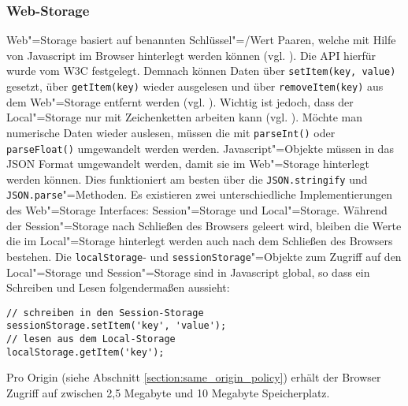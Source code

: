 \subsubsection*{Web-Storage}
Web"=Storage basiert auf benannten Schlüssel"=/Wert Paaren, welche mit Hilfe von Javascript im Browser hinterlegt werden können (vgl. \cite{html5upandrunning}). Die \ac{API} hierfür wurde vom \ac{W3C} festgelegt. Demnach können Daten über \texttt{setItem(key, value)} gesetzt, über \texttt{getItem(key)} wieder ausgelesen und über \texttt{removeItem(key)} aus dem Web"=Storage entfernt werden (vgl. \cite{W3C2011}). Wichtig ist jedoch, dass der Local"=Storage nur mit Zeichenketten arbeiten kann (vgl. \cite{W3C2011}). Möchte man numerische Daten wieder auslesen, müssen die mit \texttt{parseInt()} oder \texttt{parseFloat()} umgewandelt werden werden. Javascript"=Objekte müssen in das \ac{JSON} Format umgewandelt werden, damit sie im Web"=Storage hinterlegt werden können. Dies funktioniert am besten über die \texttt{JSON.stringify} und \texttt{JSON.parse}"=Methoden. Es existieren zwei unterschiedliche Implementierungen des Web"=Storage Interfaces: Session"=Storage und Local"=Storage. Während der Session"=Storage nach Schließen des Browsers geleert wird, bleiben die Werte die im Local"=Storage hinterlegt werden auch nach dem Schließen des Browsers bestehen. Die \texttt{localStorage}- und \texttt{sessionStorage}"=Objekte zum Zugriff auf den Local"=Storage und Session"=Storage sind in Javascript global, so dass ein Schreiben und Lesen folgendermaßen aussieht:
\begin{lstlisting}
// schreiben in den Session-Storage
sessionStorage.setItem('key', 'value');
// lesen aus dem Local-Storage
localStorage.getItem('key');
\end{lstlisting}
Pro Origin (siehe Abschnitt \ref{section:same_origin_policy}) erhält der Browser Zugriff auf zwischen 2,5 Megabyte und 10 Megabyte Speicherplatz.

